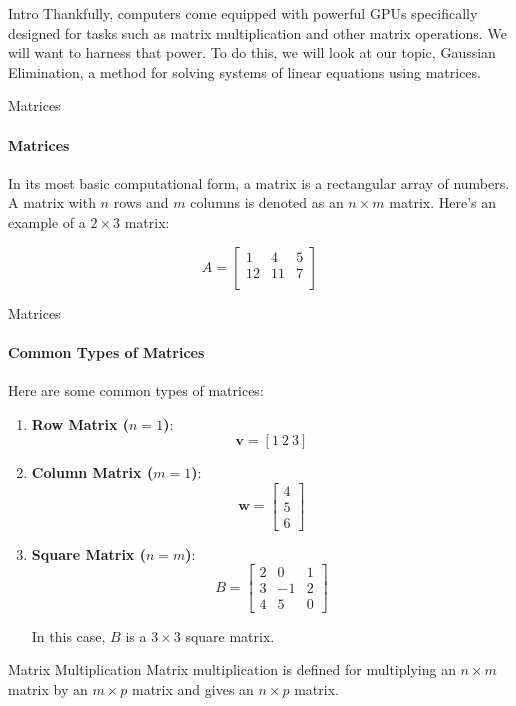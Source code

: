 \documentclass{beamer}
\begin{document}
\begin{frame}{Intro}
Thankfully, computers come equipped with powerful GPUs specifically designed for tasks such as matrix multiplication and other matrix operations. We will want to harness that power. To do this, we will look at our topic, Gaussian Elimination, a method for solving systems of linear equations using matrices.
\end{frame}

\begin{frame}{Matrices}
\framesubtitle{Matrices}
In its most basic computational form, a matrix is a rectangular array of numbers. A matrix with \(n\) rows and \(m\) columns is denoted as an \(n \times m\) matrix. Here's an example of a \(2 \times 3\) matrix:

\[
A = 
\begin{bmatrix}
    1 & 4 & 5 \\
    12 & 11 & 7 \\
\end{bmatrix}
\]  
\end{frame}

\begin{frame}{Matrices}
\framesubtitle{Common Types of Matrices}
Here are some common types of matrices:

\begin{enumerate}
    \item \textbf{Row Matrix (\(n=1\))}:
    \[
    \mathbf{v} = [1 \ 2 \ 3]
    \]
    \item \textbf{Column Matrix (\(m=1\))}: 
    \[
    \mathbf{w} =
    \begin{bmatrix}
        4 \\
        5 \\
        6
    \end{bmatrix}
    \]
    
    \item \textbf{Square Matrix (\(n=m\))}: 
    \[
    B =
    \begin{bmatrix}
        2 & 0 & 1 \\
        3 & -1 & 2 \\
        4 & 5 & 0
    \end{bmatrix}
    \]
    
    In this case, \(B\) is a \(3 \times 3\) square matrix.
    
\end{enumerate}
\end{frame}

\begin{frame}{Matrix Multiplication}
Matrix multiplication is defined for multiplying an \(n \times m\) matrix by an \(m \times p\) matrix and gives an \(n \times p\) matrix.    
\end{frame}
\end{document}
